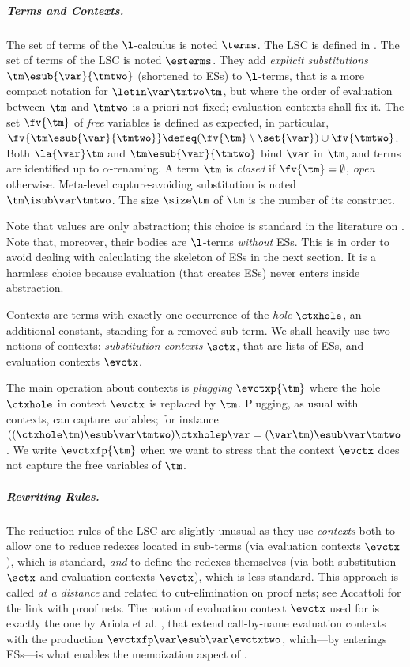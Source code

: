\subparagraph{Terms and Contexts.} The set of terms of the  $\l$-calculus is noted $\terms$.  The \cbneed LSC is defined in .  The set of terms of the \cbneed LSC is noted $\esterms$. They add  \emph{explicit substitutions}  $\tm\esub{\var}{\tmtwo}$ (shortened to ESs) to $\l$-terms, that is 
a more compact notation for $\letin\var\tmtwo\tm$, but where the order of evaluation between $\tm$ and $\tmtwo$ is a priori not fixed; evaluation contexts shall fix it.
The set $\fv{\tm}$ of \emph{free} variables is defined as expected, in particular,
$\fv{\tm\esub{\var}{\tmtwo}} \defeq
(\fv{\tm} \setminus \set{\var}) \cup \fv{\tmtwo}$. Both $\la{\var}\tm$ and $\tm\esub{\var}{\tmtwo}$ bind $\var$ in $\tm$, and terms are identified up to $\alpha$-renaming. 
A term $\tm$ is \emph{closed} if $\fv{\tm} = \emptyset$, \emph{open} otherwise.
Meta-level capture-avoiding substitution is noted $\tm\isub\var\tmtwo$. The size $\size\tm$ of $\tm$ is the number of its construct.

Note that values are only abstraction; this choice is standard in the literature on \cbneed. Note that, moreover, their bodies are $\l$-terms \emph{without} ESs. This is in order to avoid dealing with calculating the skeleton of ESs in the next section. It is a harmless choice because evaluation (that creates ESs) never enters inside abstraction.

Contexts are terms with exactly one occurrence of the \emph{hole} $\ctxhole$, an additional constant, standing for a removed sub-term. We shall heavily use two notions of contexts: \emph{substitution contexts} $\sctx$, that are lists of ESs, and evaluation contexts $\evctx$.

The main operation about contexts is \emph{plugging} $\evctxp{\tm}$ where the hole $\ctxhole$ in context 
$\evctx$ is replaced by $\tm$. Plugging, as usual with contexts, can
capture variables; for instance $((\ctxhole \tm)\esub\var\tmtwo)\ctxholep\var = (\var\tm)\esub\var\tmtwo$. 
We write $\evctxfp{\tm}$ when we want to stress that the context $\evctx$ does not capture the free variables of $\tm$.

\subparagraph{Rewriting Rules.}
The reduction rules of the \cbneed LSC are slightly unusual as they use \emph{contexts} both to allow one to reduce redexes located in sub-terms (via evaluation contexts $\evctx$), which is standard, \emph{and} to define the redexes themselves (via both substitution $\sctx$ and evaluation contexts $\evctx$), which is less standard. This approach is 
called \emph{at a distance} and related to cut-elimination on proof nets; see Accattoli \cite{DBLP:journals/tcs/Accattoli15,DBLP:conf/ictac/Accattoli18} for the link with proof nets. The notion of evaluation context $\evctx$ used for \cbneed is exactly the one by Ariola et al. \cite{DBLP:conf/popl/AriolaFMOW95}, that extend call-by-name evaluation contexts with the production $\evctxfp\var\esub\var\evctxtwo$, which---by enterings ESs---is what enables the memoization aspect of \cbneed.


